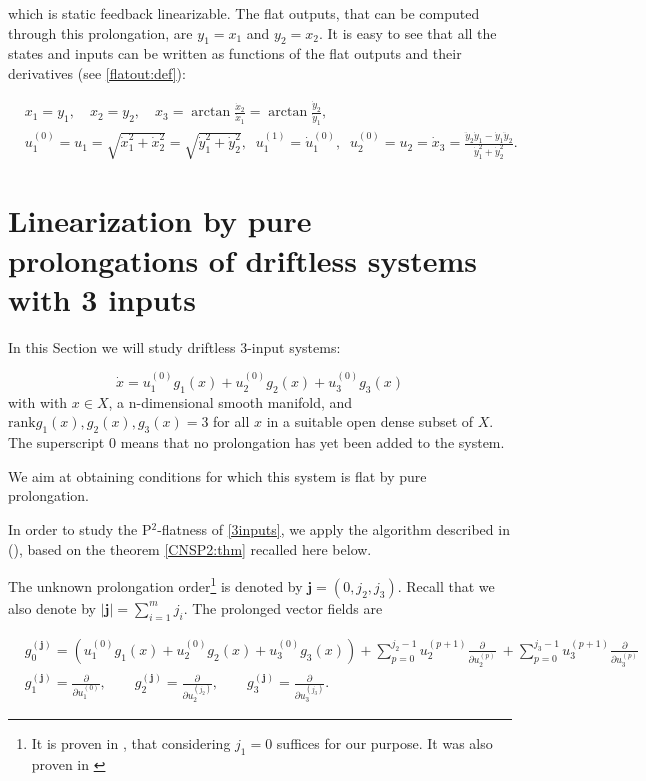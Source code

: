 \documentclass[10pt]{article}
\newcommand{\3}{\mathbf{3}}
\newcommand{\2}{\mathbf{2}}
\newcommand{\1}{\mathbf{1}}
\newcommand{\0}{\mathbf{0}}
\newcommand{\bj}{\mathbf{j}}
\newcommand{\mbf}[1]{\mathbf{#1}}
\newcommand{\rk}{\mathrm{rank}}
\newcommand{\ddu}[2]{\frac{\partial}{\partial u_{#1}^{(#2)}}}
\begin{document}
 which is static feedback linearizable. The flat outputs, that can be computed through this prolongation, are $y_1=x_1$ and $y_2=x_2$. It is easy to see that all the states and inputs can be written as functions of the flat outputs and their derivatives (see \eqref{flatout:def}):

\[
\begin{aligned} &x_1=y_1, \quad x_2=y_2, \quad x_3= \arctan \frac{\dot{x}_2}{\dot{x}_1} =  \arctan \frac{\dot{y}_2}{\dot{y}_1},\\
&u_{1}^{(0)} = u_1=\sqrt{\dot{x}_1^2+\dot{x}_2^2}= \sqrt{\dot{y}_{1}^2+\dot{y}_{2}^2}, \;\;  u_{1}^{(1)} =\dot{u}_{1}^{(0)} , \;\;
u_{2}^{(0)} = u_2=\dot{x}_3 = \frac{\ddot{y}_{2}\dot{y}_{1}-\dot{y}_{1}\ddot{y}_{2}}{\dot{y}_{1}^2+\dot{y}_{2}^2}.
\end{aligned}
\]



\section{Linearization by pure prolongations of driftless systems with 3 inputs}
\label{section3inputs}

In this Section we will study driftless $3$-input systems:

\begin{equation}\label{3inputs}
\dot{x} = u_{1}^{(0)}g_{1}(x) + u_{2}^{(0)}g_{2}(x) + u_{3}^{(0)}g_{3}(x)
\end{equation}
with with $x \in X$,  a n-dimensional smooth manifold, and $\rk{g_{1}(x), g_{2}(x), g_{3}(x)} = 3$ for all $x$ in a suitable open dense subset of $X$. The superscript $0$ means that no prolongation has yet been added to the system.

We aim at obtaining  conditions for which this system is flat by pure prolongation.

In order to study the P$^{2}$-flatness of \eqref{3inputs}, we apply the algorithm described in (\cite[Section 4.3]{Levine2023}), based on the theorem \ref{CNSP2:thm} recalled here below.

The unknown prolongation order\footnote{It is proven in \cite[Lemma 4.4]{Levine2023}, that considering $j_{1} = 0$ suffices for our purpose. It was also proven in \cite{ST96}} is denoted by $\mbf{j}=(0, j_{2}, j_{3})$. Recall that we also denote by $\mid \bj \mid = \sum_{i=1}^{m}  j_{i}$.  The prolonged vector fields are

\begin{equation}\label{prolvecfields:eq}
\begin{aligned}
&g_{0}^{(\mbf{j})}= \left(u_{1}^{(0)}g_{1}(x) + u_{2}^{(0)}g_{2}(x) + u_{3}^{(0)}g_{3}(x)\right) + \sum_{p=0}^{j_{2}-1} u_{2}^{(p+1)}\ddu{2}{p}\ + \sum_{p=0}^{j_{3}-1} u_{3}^{(p+1)}\ddu{3}{p}\\
&g_{1}^{(\mbf{j})}= \ddu{1}{0}, \qquad g_{2}^{(\mbf{j})}= \ddu{2}{j_{2}}, \qquad g_{3}^{(\mbf{j})}= \ddu{3}{j_{3}}.
\end{aligned}
\end{equation}
\end{document}

